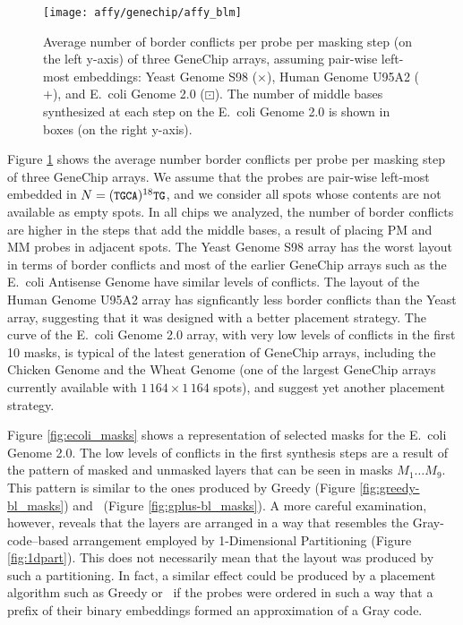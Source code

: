 \begin{figure}[t]\centering
\texttt{[image: affy/genechip/affy\_blm]}
\caption{\label{fig:affy_blm}%
  Average number of border conflicts per probe per masking step (on the left
  y-axis) of three GeneChip arrays, assuming pair-wise left-most embeddings:
  Yeast Genome S98 ({\scriptsize $\times$}), Human Genome U95A2 ({\tiny $+$}),
  and E.\ coli Genome 2.0 ({\tiny $\boxdot$}). The number of middle bases
  synthesized at each step on the E.\ coli Genome 2.0 is shown in boxes (on the
  right y-axis).}
\end{figure}

Figure \ref{fig:affy_blm} shows the average number border conflicts per probe
per masking step of three GeneChip arrays. We assume that the probes are
pair-wise left-most embedded in $N=({\text{\small{\tt{TGCA}}}})^{18}{\text{\small{\tt{TG}}}}$, and we consider
all spots whose contents are not available as empty spots. In all chips we
analyzed, the number of border conflicts are higher in the steps that add the
middle bases, a result of placing PM and MM probes in adjacent spots. The Yeast
Genome S98 array has the worst layout in terms of border conflicts and most of
the earlier GeneChip arrays such as the E.\ coli Antisense Genome have similar
levels of conflicts. The layout of the Human Genome U95A2 array has signficantly
less border conflicts than the Yeast array, suggesting that it was designed with
a better placement strategy. The curve of the E.\ coli Genome 2.0 array, with
very low levels of conflicts in the first 10 masks, is typical of the latest
generation of GeneChip arrays, including the Chicken Genome and the Wheat Genome
(one of the largest GeneChip arrays currently available with
$1\,164\times 1\,164$ spots), and suggest yet another placement strategy.

Figure \ref{fig:ecoli_masks} shows a representation of selected masks for the
E.\ coli Genome 2.0. The low levels of conflicts in the first synthesis steps
are a result of the pattern of masked and unmasked layers that can be seen in
masks $M_1 \dots M_9$. This pattern is similar to the ones produced by Greedy
(Figure \ref{fig:greedy-bl_masks}) and \Greedyplus\ (Figure
\ref{fig:gplus-bl_masks}). A more careful examination, however, reveals that the
layers are arranged in a way that resembles the Gray-code--based arrangement
employed by 1-Dimensional Partitioning (Figure \ref{fig:1dpart}). This does not
necessarily mean that the layout was produced by such a partitioning. In fact, a
similar effect could be produced by a placement algorithm such as Greedy or
\Greedyplus\ if the probes were ordered in such a way that a prefix of their
binary embeddings formed an approximation of a Gray code.

